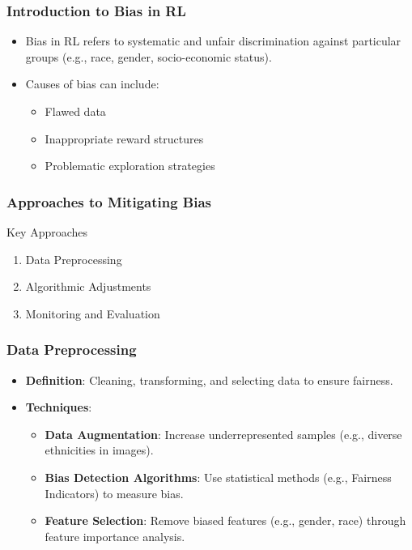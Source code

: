 \documentclass[aspectratio=169]{beamer}
\begin{document}
\begin{frame}[fragile]
    \frametitle{Introduction to Bias in RL}
    \begin{itemize}
        \item Bias in RL refers to systematic and unfair discrimination against particular groups (e.g., race, gender, socio-economic status).
        \item Causes of bias can include:
        \begin{itemize}
            \item Flawed data
            \item Inappropriate reward structures
            \item Problematic exploration strategies
        \end{itemize}
    \end{itemize}
\end{frame}

\begin{frame}[fragile]
    \frametitle{Approaches to Mitigating Bias}
    \begin{block}{Key Approaches}
        \begin{enumerate}
            \item Data Preprocessing
            \item Algorithmic Adjustments
            \item Monitoring and Evaluation
        \end{enumerate}
    \end{block}
\end{frame}

\begin{frame}[fragile]
    \frametitle{Data Preprocessing}
    \begin{itemize}
        \item \textbf{Definition}: Cleaning, transforming, and selecting data to ensure fairness.
        \item \textbf{Techniques}:
        \begin{itemize}
            \item \textbf{Data Augmentation}: Increase underrepresented samples (e.g., diverse ethnicities in images).
            \item \textbf{Bias Detection Algorithms}: Use statistical methods (e.g., Fairness Indicators) to measure bias.
            \item \textbf{Feature Selection}: Remove biased features (e.g., gender, race) through feature importance analysis.
        \end{itemize}
    \end{itemize}
\end{frame}
\end{document}
